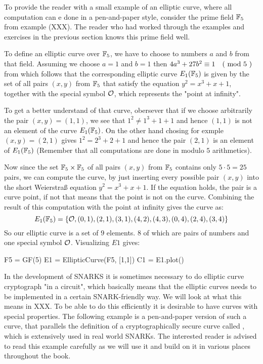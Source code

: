 \begin{example}To provide the reader with a small example of an elliptic curve, where all computation can e done in a pen-and-paper style, consider the prime field $\mathbb{F}_5$ from example (XXX). The reader who had worked through the examples and exercises in the previous section knows this prime field well.

To define an elliptic curve over $\mathbb{F}_5$, we have to choose to numbers $a$ and $b$ from that field. Assuming we choose $a=1$ and $b=1$ then $4a^3+ 27b^2 \equiv 1 \quad \text{( mod } 5 \text{ )}$ from which follows that the corresponding elliptic curve $E_1(\mathbb{F}_5)$ is given by the set of all pairs $(x,y)$ from $\mathbb{F}_5$ that satisfy the equation $y^2=x^3+x+1$, together with the special symbol $\mathcal{O}$, which represents the "point at infinity". 

To get a better understand of that curve, obersever that if we choose arbitrarily the pair $(x,y)=(1,1)$, we see that $1^2 \neq 1^3+1 + 1$ and hence $(1,1)$ is not an element of the curve $E_1(\mathbb{F}_5)$. On the other hand chosing for exmple $(x,y)=(2,1)$ gives $1^2 = 2^3 + 2 + 1$ and hence the pair $(2,1)$ is an element of $E_1(\mathbb{F}_5)$ (Remember that all computations are done in modulo $5$ arithmetics).

Now since the set $\mathbb{F}_5\times \mathbb{F}_5$ of all pairs $(x,y)$ from $\mathbb{F}_5$ contains only $5\cdot 5=25$ pairs, we can compute the curve, by just inserting every possible pair $(x,y)$ into the short Weierstraß equation $y^2 = x^3 + x +1$. If the equation holds, the pair is a curve point, if not that means that the point is not on the curve. Combining the result of this computation with the point at infinity gives the curve as:
$$
E_1(\mathbb{F}_5) = \{\mathcal{O}, (0,1),(2,1),(3,1),(4,2),(4,3),(0,4),(2,4),(3,4)\}
$$
So our elliptic curve is a set of $9$ elements. $8$ of which are pairs of numbers and one special symbol $\mathcal{O}$. Visualizing $E1$ gives:
\begin{sagesilent}
F5 = GF(5)
E1 = EllipticCurve(F5, [1,1])
C1 = E1.plot()
\end{sagesilent}
\begin{center} 
\end{center}
\end{example}
In the development of SNARKS it is sometimes necessary to do elliptic curve cryptograph "in a circuit", which basically means that the elliptic curves needs to be implemented in a certain SNARK-friendly way. We will look at what this means in XXX. To be able to do this efficiently it is desirable to have curves with special properties. The following example is a pen-and-paper version of such a curve, that parallels the definition of a cryptographically secure curve called , which is extensively used in real world SNARKs. The interested reader is advised to read this example carefully as we will use it and build on it in various places throughout the book.
